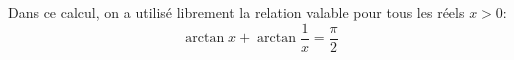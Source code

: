 \begin{enumerate}
Dans ce calcul, on a utilisé librement la relation valable pour tous les réels $x>0$:
\begin{displaymath}
\arctan x + \arctan \frac{1}{x} = \frac{\pi}{2}
\end{displaymath}
\end{enumerate}
